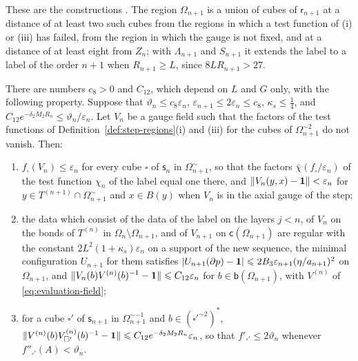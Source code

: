 \documentclass[11pt]{preprint}
\newcommand{\id}{\mathbf 1}
\DeclarePairedDelimiter{\abs}{\lvert}{\rvert}
\DeclarePairedDelimiter{\norm}{\lVert}{\rVert}
\numberwithin{equation}{section}
\begin{document}
These are the constructions \cite[(3.2)--(3.5), (3.16), (3.20)]{BalabanCRE}. The region $\Omega_{n+1}$ is a union of cubes of $\mathsf r_{n+1}$ at a distance of at least two such cubes from the regions in which a test function of (i) or (iii) has failed, from the region in which the gauge is not fixed, and at a distance of at least eight from $Z_n$; with $\Lambda_{n+1}$ and $S_{n+1}$ it extends the label to a label of the order $n + 1$ when $R_{n+1} \geqslant L$, since $8LR_{n+1} > 27$.

\begin{lemma}\label{lem:old-tests}
There are numbers $c_8 > 0$ and $C_{12}$, which depend on $L$ and $G$ only, with the following property. Suppose that $\vartheta_n \leqslant c_8\varepsilon_n$, $\varepsilon_{n+1} \leqslant 2\varepsilon_n \leqslant c_8$, $\kappa_s \leqslant \frac{1}{4}$, and $C_{12}e^{-\delta_2M_2R_n} \leqslant \vartheta_n/\varepsilon_n$. Let $V_n$ be a gauge field such that the factors of the test functions of Definition~\ref{def:step-regions}(i) and (iii) for the cubes of $\Omega^{\sim2}_{n+1}$ do not vanish. Then:
\begin{enumerate}[label=(\roman*)]
\item $f_\square(V_n) \leqslant \varepsilon_n$ for every cube $\square$ of $\mathsf s_n$ in $\Omega^\sim_{n+1}$, so that the factors $\bar\chi(f_\square/\varepsilon_n)$ of the test function $\chi_n$ of the label equal one there, and $\norm{V_n(y, x) - \id} < \varepsilon_n$ for $y \in T^{(n+1)} \cap \Omega^\sim_{n+1}$ and $x \in B(y)$ when $V_n$ is in the axial gauge of the step;
\item the data which consist of the data of the label on the layers $j < n$, of $V_n$ on the bonds of $T^{(n)}$ in $\Omega_n \setminus \Omega_{n+1}$, and of $V_{n+1}$ on $\mathsf c(\Omega_{n+1})$ are regular with the constant $2L^2(1 + \kappa_s)\varepsilon_n$ on a support of the new sequence, the minimal configuration $U_{n+1}$ for them satisfies $\abs{U_{n+1}(\partial p) - \id} \leqslant 2B_3\varepsilon_{n+1}(\eta/a_{n+1})^2$ on $\Omega_{n+1}$, and $\norm{V_n(b)V^{(n)}(b)^{-1} - \id} \leqslant C_{12}\varepsilon_n$ for $b \in \mathsf b(\Omega_{n+1})$, with $V^{(n)}$ of \eqref{eq:evaluation-field};
\item for a cube $\square'$ of $\mathsf s_{n+1}$ in $\Omega^{\sim-1}_{n+1}$ and $b \in (\square'^{\sim2})^*$, $\norm{V^{(n)}(b)V^{(n)}_{\square'}(b)^{-1} - \id} \leqslant C_{12}e^{-\delta_2M_2R_n}\varepsilon_n$, so that $f'_{\square'} \leqslant 2\vartheta_n$ whenever $f''_{\square'}(A) < \vartheta_n$.
\end{enumerate}
\end{lemma}
\end{document}
